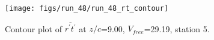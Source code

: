 \begin{figure}[H]
\centering
\texttt{[image: figs/run\_48/run\_48\_rt\_contour]}
\caption{Contour plot of $\overline{r^\prime t^\prime}$ at $z/c$=9.00, $V_{free}$=29.19, station 5.}
\end{figure}


